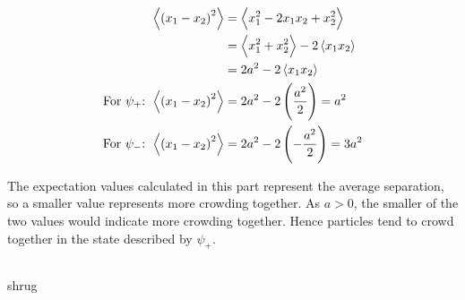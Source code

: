 \subsection{}
\begin{align*}
    \expectationvalue{\del{x_1 - x_2}^2} & = \expectationvalue{x_1^2 - 2 x_1 x_2 + x_2^2}\\
    & = \expectationvalue{x_1^2 + x_2^2} - 2 \expectationvalue{x_1 x_2}\\
    & = 2a^2 - 2 \expectationvalue{x_1 x_2}\\
    \textrm{For $ \psi_+ $: } \expectationvalue{\del{x_1 - x_2}^2} & = 2a^2 - 2 \del{\frac{a^2}{2}} = a^2\\
    \textrm{For $ \psi_- $: } \expectationvalue{\del{x_1 - x_2}^2} & = 2a^2 - 2 \del{- \frac{a^2}{2}} = 3a^2
\end{align*}

The expectation values calculated in this part represent the average separation, so a smaller value represents more crowding together. As $ a > 0 $, the smaller of the two values would indicate more crowding together. Hence particles tend to crowd together in the state described by $ \psi_+ $.

\subsection{}

shrug
